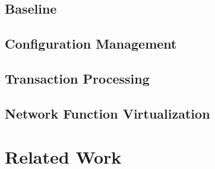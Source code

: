 \documentclass[twocolumn]{article}
\begin{document}
\subsection{Baseline}

\subsection{Configuration Management}

\subsection{Transaction Processing}

\subsection{Network Function Virtualization}

\section{Related Work}
\end{document}
